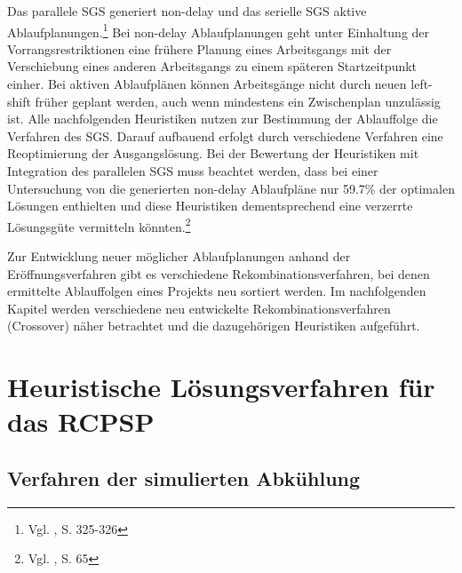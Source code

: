 \documentclass[a4paper,12pt,normalheadings,footexclude,headinclude,liststotoc,nochapterprefix,onecolumn,oneside,parskip,pointlessnumbers]{scrreprt}
\begin{document}
Das parallele SGS generiert non-delay und das serielle SGS aktive Ablaufplanungen.\footnote{Vgl. \cite{kolisch1996serial}, S. 325-326\label{1996}} Bei non-delay Ablaufplanungen geht unter Einhaltung der Vorrangsrestriktionen eine frühere Planung eines Arbeitsgangs mit der Verschiebung eines anderen Arbeitsgangs zu einem späteren Startzeitpunkt einher. Bei aktiven Ablaufplänen können Arbeitsgänge nicht durch neuen left-shift früher geplant werden, auch wenn mindestens ein Zwischenplan unzulässig ist. Alle nachfolgenden Heuristiken nutzen zur Bestimmung der Ablauffolge die Verfahren des SGS. Darauf aufbauend erfolgt durch verschiedene Verfahren eine Reoptimierung der Ausgangslösung. Bei der Bewertung der Heuristiken mit Integration des parallelen SGS muss beachtet werden, dass bei einer Untersuchung von \cite{kolisch1996serial} die generierten non-delay Ablaufpläne nur 59.7\% der optimalen Lösungen enthielten und diese Heuristiken dementsprechend eine verzerrte Lösungsgüte vermitteln könnten.\footnote{Vgl. \cite{hartmann1999project}, S. 65}

Zur Entwicklung neuer möglicher Ablaufplanungen anhand der Eröffnungsverfahren gibt es verschiedene Rekombinationsverfahren, bei denen ermittelte Ablauffolgen eines Projekts neu sortiert werden. %
Im nachfolgenden Kapitel werden verschiedene neu entwickelte Rekombinationsverfahren (Crossover) näher betrachtet und die dazugehörigen Heuristiken aufgeführt.





\chapter{Heuristische Lösungsverfahren für das RCPSP} \label{Hauptteil}
\section{Verfahren der simulierten Abkühlung}\label{bouleimen}
\end{document}
